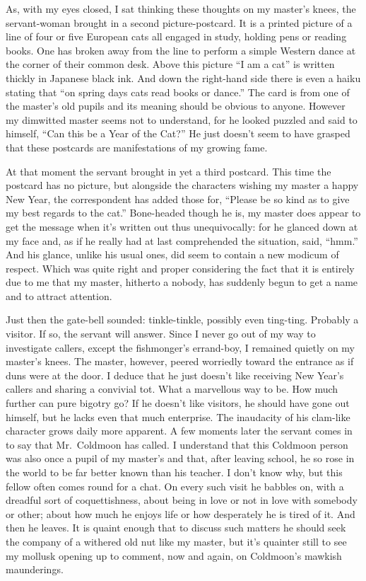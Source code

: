 \documentclass[12pt, openright]{book}
\begin{document}
As, with my eyes closed, I sat thinking these thoughts on my master's
knees, the servant-woman brought in a second picture-postcard. It is a
printed picture of a line of four or five European cats all engaged in
study, holding pens or reading books. One has broken away from the line
to perform a simple Western dance at the corner of their common desk.
Above this picture ``I am a cat'' is written thickly in Japanese black
ink. And down the right-hand side there is even a haiku stating that
``on spring days cats read books or dance.'' The card is from one of the
master's old pupils and its meaning should be obvious to anyone. However
my dimwitted master seems not to understand, for he looked puzzled and
said to himself, ``Can this be a Year of the Cat?'' He just doesn't seem
to have grasped that these postcards are manifestations of my growing
fame.

At that moment the servant brought in yet a third postcard. This time
the postcard has no picture, but alongside the characters wishing my
master a happy New Year, the correspondent has added those for, ``Please
be so kind as to give my best regards to the cat.'' Bone-headed though
he is, my master does appear to get the message when it's written out
thus unequivocally: for he glanced down at my face and, as if he really
had at last comprehended the situation, said, ``hmm.'' And his glance,
unlike his usual ones, did seem to contain a new modicum of respect.
Which was quite right and proper considering the fact that it is
entirely due to me that my master, hitherto a nobody, has suddenly begun
to get a name and to attract attention.

Just then the gate-bell sounded: tinkle-tinkle, possibly even ting-ting.
Probably a visitor. If so, the servant will answer. Since I never go out
of my way to investigate callers, except the fishmonger's errand-boy, I
remained quietly on my master's knees. The master, however, peered
worriedly toward the entrance as if duns were at the door. I deduce that
he just doesn't like receiving New Year's callers and sharing a
convivial tot. What a marvellous way to be. How much further can pure
bigotry go? If he doesn't like visitors, he should have gone out
himself, but he lacks even that much enterprise. The inaudacity of his
clam-like character grows daily more apparent. A few moments later the
servant comes in to say that Mr.~Coldmoon has called. I understand that
this Coldmoon person was also once a pupil of my master's and that,
after leaving school, he so rose in the world to be far better known
than his teacher. I don't know why, but this fellow often comes round
for a chat. On every such visit he babbles on, with a dreadful sort of
coquettishness, about being in love or not in love with somebody or
other; about how much he enjoys life or how desperately he is tired of
it. And then he leaves. It is quaint enough that to discuss such matters
he should seek the company of a withered old nut like my master, but
it's quainter still to see my mollusk opening up to comment, now and
again, on Coldmoon's mawkish maunderings.
\end{document}
